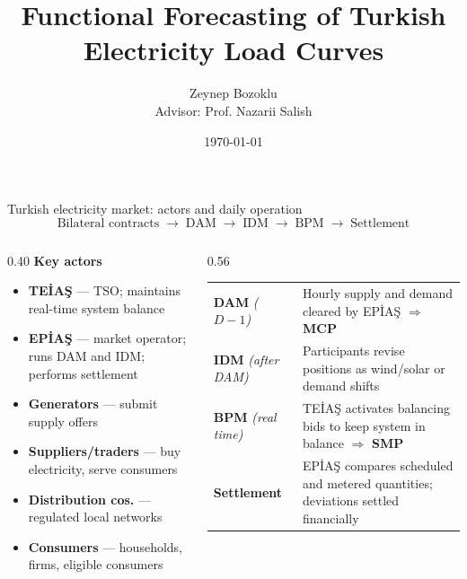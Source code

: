 \documentclass[10pt,aspectratio=169]{beamer}
\title[Functional Load Forecasting]{Functional Forecasting of Turkish Electricity Load Curves}
\author{Zeynep Bozoklu \\[0.3em] \small Advisor: Prof. Nazarii Salish}
\institute{Department of Economics, Universidad Carlos III Madrid}
\date{\today}
\begin{document}
\begin{frame}
  \titlepage
\end{frame}

\begin{frame}{Turkish electricity market: actors and daily operation}
  \small
  \vspace{-0.3em}
  \[
    \text{Bilateral contracts}
    \;\rightarrow\;
    \text{DAM}
    \;\rightarrow\;
    \text{IDM}
    \;\rightarrow\;
    \text{BPM}
    \;\rightarrow\;
    \text{Settlement}
  \]
  \vspace{-0.5em}
  \begin{columns}
    \begin{column}{0.40\textwidth}
      \textbf{Key actors}
      \begin{itemize}\small
        \item \textbf{TEİAŞ} --- TSO; maintains real-time system balance
        \item \textbf{EPİAŞ} --- market operator; runs DAM and IDM; performs settlement
        \item \textbf{Generators} --- submit supply offers
        \item \textbf{Suppliers/traders} --- buy electricity, serve consumers
        \item \textbf{Distribution cos.} --- regulated local networks
        \item \textbf{Consumers} --- households, firms, eligible consumers
      \end{itemize}
    \end{column}
    \begin{column}{0.56\textwidth}
      \begin{tabular}{@{}lp{}@{}}
        \toprule
        \textbf{DAM} \textit{\scriptsize($D-1$)}
          & Hourly supply and demand cleared by EPİAŞ
            $\Rightarrow$ \textbf{MCP} \\[0.35em]
        \textbf{IDM} \textit{\scriptsize(after DAM)}
          & Participants revise positions as wind/solar or demand shifts \\[0.35em]
        \textbf{BPM} \textit{\scriptsize(real time)}
          & TEİAŞ activates balancing bids to keep system in balance
            $\Rightarrow$ \textbf{SMP} \\[0.35em]
        \textbf{Settlement}
          & EPİAŞ compares scheduled and metered quantities;
            deviations settled financially \\
        \bottomrule
      \end{tabular}
    \end{column}
  \end{columns}
\end{frame}
\end{document}
